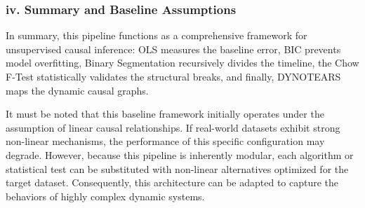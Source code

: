 \subsubsection*{iv. Summary and Baseline Assumptions}
In summary, this pipeline functions as a comprehensive framework for unsupervised causal inference: OLS measures the baseline error, BIC prevents model overfitting, Binary Segmentation recursively divides the timeline, the Chow F-Test statistically validates the structural breaks, and finally, DYNOTEARS maps the dynamic causal graphs. 

It must be noted that this baseline framework initially operates under the assumption of linear causal relationships. If real-world datasets exhibit strong non-linear mechanisms, the performance of this specific configuration may degrade. However, because this pipeline is inherently modular, each algorithm or statistical test can be substituted with non-linear alternatives optimized for the target dataset. Consequently, this architecture can be adapted to capture the behaviors of highly complex dynamic systems.












